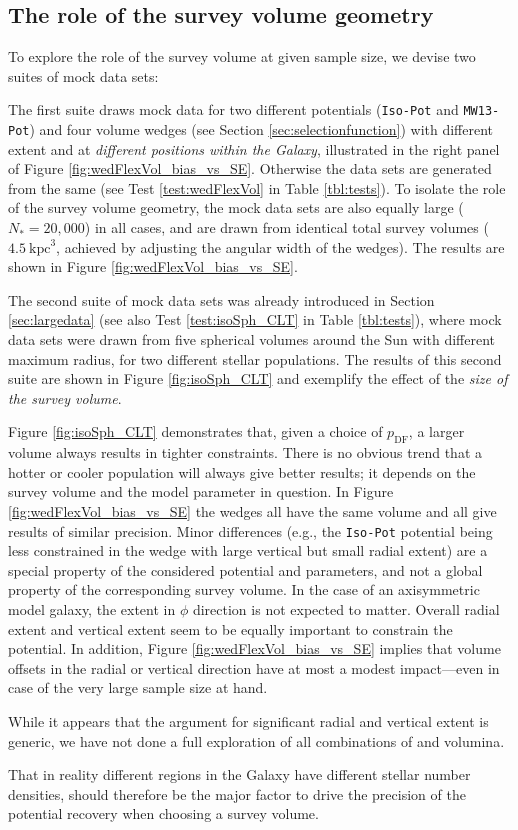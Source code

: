 \subsection{The role of the survey volume geometry} \label{sec:results_obsvolume}

To explore the role of the survey volume at given sample size, we devise two suites of mock data sets: 

The first suite draws mock data for two different potentials (\texttt{Iso-Pot} and \texttt{MW13-Pot}) and four volume wedges (see Section \ref{sec:selectionfunction}) with different extent and at {\it different positions within the Galaxy}, illustrated in the right panel of Figure \ref{fig:wedFlexVol_bias_vs_SE}. Otherwise the data sets are generated from the same \pmodel{} (see Test \ref{test:wedFlexVol} in Table \ref{tbl:tests}). To isolate the role of the survey volume geometry, the mock data sets are also equally large ($N_{*} = 20,000$) in all cases, and are drawn from identical total survey volumes ($4.5~\text{kpc}^3$, achieved by adjusting the angular width of the wedges). The results are shown in Figure \ref{fig:wedFlexVol_bias_vs_SE}.

The second suite of mock data sets was already introduced in Section \ref{sec:largedata} (see also Test \ref{test:isoSph_CLT} in Table \ref{tbl:tests}), where mock data sets were drawn from five spherical volumes around the Sun with different maximum radius, for two different stellar populations. The results of this second suite are shown in Figure \ref{fig:isoSph_CLT} and exemplify the effect of the {\it size of the survey volume}.

Figure \ref{fig:isoSph_CLT} demonstrates that, given a choice of $p_\text{DF}$, a larger volume always results in tighter constraints. There is no obvious trend that a hotter or cooler population will always give better results; it depends on the survey volume and the model parameter in question. In Figure \ref{fig:wedFlexVol_bias_vs_SE} the wedges all have the same volume and all give results of similar precision. Minor differences (e.g., the \texttt{Iso-Pot} potential being less constrained in the wedge with large vertical but small radial extent) are a special property of the considered potential and parameters, and not a global property of the corresponding survey volume. In the case of an axisymmetric model galaxy, the extent in $\phi$ direction is not expected to matter. Overall radial extent and vertical extent seem to be equally important to constrain the potential. In addition, Figure \ref{fig:wedFlexVol_bias_vs_SE} implies that volume offsets in the radial or vertical direction have at most a modest impact---even in case of the very large sample size at hand.

While it appears that the argument for significant radial and vertical extent is generic, we have not done a full exploration of all combinations of \pmodel{} and volumina.

That in reality different regions in the Galaxy have different stellar number densities, should therefore be the major factor to drive the precision of the potential recovery when choosing a survey volume.
